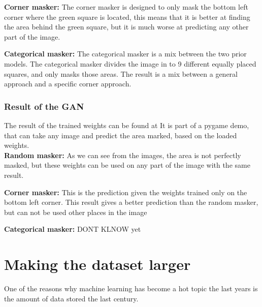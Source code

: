   \vspace{5px}
  \textbf{Corner masker:} The corner masker is designed to only mask the bottom left corner where the green square is located, this means that it is better at finding the area behind the green square, but it is much 
  worse at predicting any other part of the image.
  
  \vspace{5px}
  \textbf{Categorical masker:} The categorical masker is a mix between the two prior models. The categorical masker divides the image in to 9 different equally placed squares, and only masks those areas. %
  The result is a mix between a general approach and a specific corner approach.

  \subsubsection{Result of the GAN}
  The result of the trained weights can be found at %
  It is part of a pygame demo, that can take any image and predict the area marked, based on the loaded weights.\\
  
  \vspace{5px}
  \textbf{Random masker:}
  As we can see from the images, the area is not perfectly masked, but these weights can be used on any part of the image with the same result.
  
  \vspace{5px}
  \textbf{Corner masker:}  
  This is the prediction given the weights trained only on the bottom left corner. This result gives a better prediction than the random masker, but can not be used other places in the image
  
  \vspace{5px}
  \textbf{Categorical masker:} 
  DONT KLNOW yet
  
  
  
  
  
  
  
\section{Making the dataset larger}
  One of the reasons why machine learning has become a hot topic the last years is the amount of data stored the last century. %
  